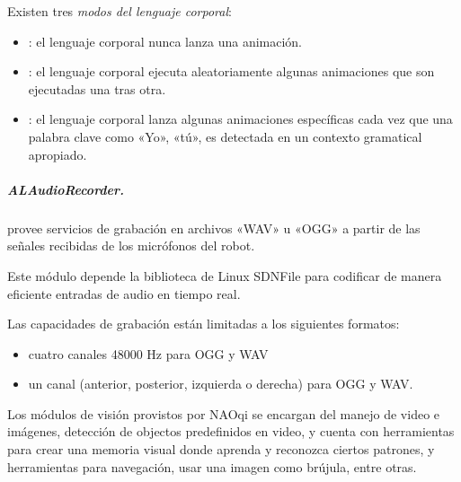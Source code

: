 \begin{sphinxVerbatim}[commandchars=\\\{\}]
\end{sphinxVerbatim}


Existen tres \textit{modos del lenguaje corporal}:
\begin{itemize}
\item {} 
: el lenguaje corporal nunca lanza una animación.

\item {} 
: el lenguaje corporal ejecuta aleatoriamente algunas animaciones que son ejecutadas una tras otra.

\item {} 
: el lenguaje corporal lanza algunas animaciones específicas cada vez que una palabra clave como «Yo», «tú», es detectada en un contexto gramatical apropiado.

\end{itemize}


\subparagraph{ALAudioRecorder.}
\label{\detokenize{chapter_one/naoqi:alaudiorecorder}}
 provee servicios de grabación en archivos «WAV»
u «OGG» a partir de las señales recibidas de los micrófonos del robot.

Este módulo depende la biblioteca de Linux SDNFile para
codificar de manera eficiente entradas de audio en tiempo real.

Las capacidades de grabación están limitadas a los siguientes
formatos:
\begin{itemize}
\item {} 
cuatro canales 48000 Hz para OGG y WAV

\item {} 
un canal (anterior, posterior, izquierda o derecha) para OGG y WAV.

\end{itemize}

Los módulos de visión provistos por NAOqi se encargan del manejo de video e
imágenes, detección de objectos predefinidos en video, y cuenta con herramientas
para crear una memoria visual donde aprenda y reconozca ciertos patrones,
y herramientas para navegación, usar una imagen como brújula, entre otras.


